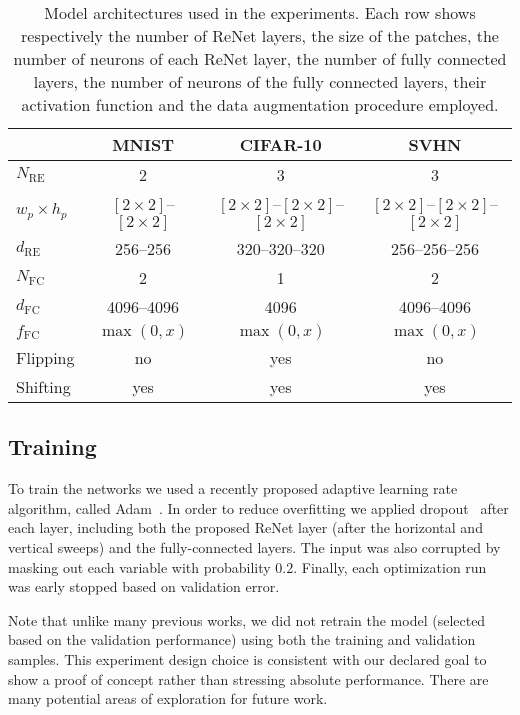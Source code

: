 \documentclass{article} \usepackage{nips15submit_e,times}
\begin{document}
\begin{table}[t]
    \centering
    \begin{tabular}{l || c | c | c }
        & MNIST & CIFAR-10 & SVHN \\
        \hline
        \hline
    $N_{\text{RE}}$ & 2 & 3 & 3 \\
        \hline
        $w_p \times h_p$ & $[2\times 2]$--$[2 \times 2]$ & $[2\times 2]$--$[2 \times 2]$--$[2
        \times 2]$ & $[2\times 2]$--$[2 \times 2]$--$[2 \times 2]$ \\
        \hline
    $d_{\text{RE}}$ & 256--256 & 320--320--320 & 256--256--256 \\
        \hline
    $N_{\text{FC}}$ & 2 & 1 & 2 \\
        \hline
    $d_{\text{FC}}$ & 4096--4096 & 4096 & 4096--4096 \\
        \hline
    $f_{\text{FC}}$ & $\max(0, x)$ & $\max(0,x)$ & $\max(0,x)$ \\
        \hline
    Flipping & no & yes & no \\
        \hline
    Shifting & yes & yes & yes \\
    \end{tabular}
    \caption{Model architectures used in the experiments. Each row shows 
             respectively the number of ReNet layers, the size of the patches, 
             the number of neurons of each ReNet layer, the number of fully 
             connected layers, the number of neurons of the fully connected
             layers, their activation function and the data augmentation 
             procedure employed.}
    \label{tbl:architectures}
\end{table}

\subsection{Training}

To train the networks we used a recently proposed adaptive learning rate 
algorithm, called Adam~\citep{Kingma2014}. In order to reduce overfitting we 
applied dropout~\citep{Srivastava14} after each layer, including both the 
proposed ReNet layer (after the horizontal and vertical sweeps) and the 
fully-connected layers. The input was also corrupted by masking out each variable 
with probability $0.2$. Finally, each optimization run was early stopped based 
on validation error.

Note that unlike many previous works, we did not retrain the model (selected
based on the validation performance) using both the training and validation
samples. This experiment design choice is consistent with our declared goal to
show a proof of concept rather than stressing absolute performance. There are
many potential areas of exploration for future work.
\end{document}
